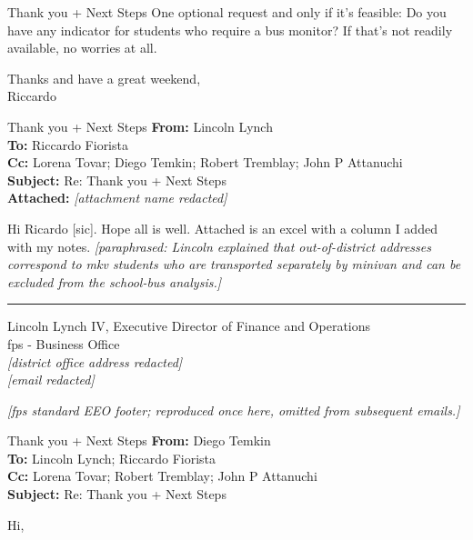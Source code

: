 {\begin{emailbox}{Thank you + Next Steps}
    One optional request and only if it’s feasible: Do you have any indicator for students who require a bus monitor? If that’s not readily available, no worries at all. \vspace{1em}

    Thanks and have a great weekend, \\
    Riccardo
\end{emailbox}

\begin{emailbox}{Thank you + Next Steps}
    \textbf{From:} Lincoln Lynch \\
    \textbf{To:} Riccardo Fiorista \\
    \textbf{Cc:} Lorena Tovar; Diego Temkin; Robert Tremblay; John P Attanuchi \\
    \textbf{Subject:} Re: Thank you + Next Steps \\
    \textbf{Attached:} \textit{[attachment name redacted]}

    \vspace{1em}
    Hi Ricardo [sic]. Hope all is well. Attached is an excel with a column I added with my notes. \textit{[paraphrased: Lincoln explained that out-of-district addresses correspond to \gls{mkv} students who are transported separately by minivan and can be excluded from the school-bus analysis.]}
    
    \noindent\rule{\textwidth}{1pt}

    Lincoln Lynch IV, Executive Director of Finance and Operations \\
    \Acrlong{fps} - Business Office \\
    \textit{[district office address redacted]} \\
    \textit{[email redacted]} \vspace{1em}

    \textit{[\gls{fps} standard EEO footer; reproduced once here, omitted from subsequent emails.]}
\end{emailbox}

\begin{emailbox}{Thank you + Next Steps}
    \textbf{From:} Diego Temkin \\
    \textbf{To:} Lincoln Lynch; Riccardo Fiorista \\
    \textbf{Cc:} Lorena Tovar; Robert Tremblay; John P Attanuchi \\
    \textbf{Subject:} Re: Thank you + Next Steps

    \vspace{1em}
    Hi, \vspace{1em}


\end{emailbox}}

